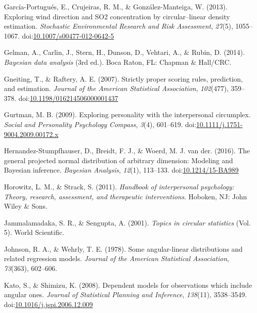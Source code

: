 \documentclass[12pt,]{article}
\begin{document}
\hypertarget{ref-garcia2013exploring}{}
García-Portugués, E., Crujeiras, R. M., \& González-Manteiga, W. (2013).
Exploring wind direction and SO2 concentration by circular--linear
density estimation. \emph{Stochastic Environmental Research and Risk
Assessment}, \emph{27}(5), 1055--1067.
doi:\href{https://doi.org/10.1007/s00477-012-0642-5}{10.1007/s00477-012-0642-5}

\hypertarget{ref-BDA}{}
Gelman, A., Carlin, J., Stern, H., Dunson, D., Vehtari, A., \& Rubin, D.
(2014). \emph{Bayesian data analysis} (3rd ed.). Boca Raton, FL: Chapman
\& Hall/CRC.

\hypertarget{ref-gneiting2007strictly}{}
Gneiting, T., \& Raftery, A. E. (2007). Strictly proper scoring rules,
prediction, and estimation. \emph{Journal of the American Statistical
Association}, \emph{102}(477), 359--378.
doi:\href{https://doi.org/10.1198/016214506000001437}{10.1198/016214506000001437}

\hypertarget{ref-gurtman2009exploring}{}
Gurtman, M. B. (2009). Exploring personality with the interpersonal
circumplex. \emph{Social and Personality Psychology Compass},
\emph{3}(4), 601--619.
doi:\href{https://doi.org/10.1111/j.1751-9004.2009.00172.x}{10.1111/j.1751-9004.2009.00172.x}

\hypertarget{ref-hernandez2016general}{}
Hernandez-Stumpfhauser, D., Breidt, F. J., \& Woerd, M. J. van der.
(2016). The general projected normal distribution of arbitrary
dimension: Modeling and Bayesian inference. \emph{Bayesian Analysis},
\emph{12}(1), 113--133.
doi:\href{https://doi.org/10.1214/15-BA989}{10.1214/15-BA989}

\hypertarget{ref-horowitz2010handbook}{}
Horowitz, L. M., \& Strack, S. (2011). \emph{Handbook of interpersonal
psychology: Theory, research, assessment, and therapeutic
interventions}. Hoboken, NJ: John Wiley \& Sons.

\hypertarget{ref-jammalamadaka2001topics}{}
Jammalamadaka, S. R., \& Sengupta, A. (2001). \emph{Topics in circular
statistics} (Vol. 5). World Scientific.

\hypertarget{ref-johnson1978some}{}
Johnson, R. A., \& Wehrly, T. E. (1978). Some angular-linear
distributions and related regression models. \emph{Journal of the
American Statistical Association}, \emph{73}(363), 602--606.

\hypertarget{ref-kato2008dependent}{}
Kato, S., \& Shimizu, K. (2008). Dependent models for observations which
include angular ones. \emph{Journal of Statistical Planning and
Inference}, \emph{138}(11), 3538--3549.
doi:\href{https://doi.org/10.1016/j.jspi.2006.12.009}{10.1016/j.jspi.2006.12.009}
\end{document}
